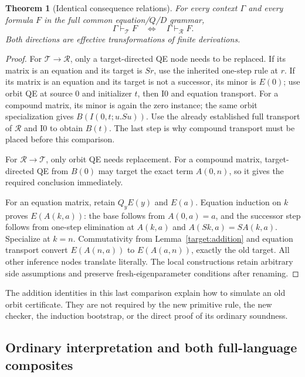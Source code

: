 \documentclass[11pt,a4paper]{article}
\newtheorem{theorem}{Theorem}[section]
\theoremstyle{definition}\newtheorem{definition}[theorem]{Definition}
\begin{document}
\begin{theorem}[Identical consequence relations]
\label{target:exact-equivalence}
For every context $\Gamma$ and every formula $F$ in the full common
equation/$Q$/$D$ grammar,
\[
 \Gamma\vdash_{\mathcal T}F
 \quad\Longleftrightarrow\quad
 \Gamma\vdash_{\mathcal R}F.
\]
Both directions are effective transformations of finite derivations.
\end{theorem}
\begin{proof}
For $\mathcal T\to\mathcal R$, only a target-directed QE node needs to be
replaced.  If its matrix is an equation and its target is $Sr$, use the
inherited one-step rule at $r$.  If its matrix is an equation and its
target is not a successor, its minor is $E(0)$; use orbit QE at source $0$
and initializer $t$, then I0 and equation transport.  For a compound matrix,
its minor is again the zero instance; the same orbit specialization gives
$B(I(0,t;u.Su))$.  Use the already established full transport of
$\mathcal R$ and I0 to obtain $B(t)$.  The last step is why compound
transport must be placed before this comparison.

For $\mathcal R\to\mathcal T$, only orbit QE needs replacement.  For a
compound matrix, target-directed QE from $B(0)$ may target the exact term
$A(0,n)$, so it gives the required conclusion immediately.

For an equation matrix, retain $Q_yE(y)$ and $E(a)$.  Equation induction on
$k$ proves $E(A(k,a))$: the base follows from $A(0,a)=a$, and the successor
step follows from one-step elimination at $A(k,a)$ and
$A(Sk,a)=S A(k,a)$.  Specialize at $k=n$.  Commutativity from
Lemma~\ref{target:addition} and equation transport convert
$E(A(n,a))$ to $E(A(a,n))$, exactly the old target.
All other inference nodes translate literally.  The local constructions
retain arbitrary side assumptions and preserve fresh-eigenparameter
conditions after renaming.
\end{proof}

The addition identities in this last comparison explain how to simulate an
old orbit certificate.  They are not required by the new primitive rule,
the new checker, the induction bootstrap, or the direct proof of its
ordinary soundness.

\subsection{Ordinary interpretation and both full-language composites}
\label{target:biinterpretation-section}
\end{document}
